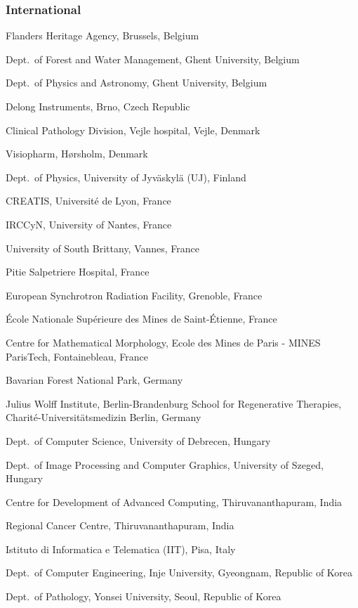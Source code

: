 \subsubsection*{International}
{\small
\begin{trivlist}
\item Flanders Heritage Agency, Brussels, Belgium
\item Dept.~of Forest and Water Management, Ghent University, Belgium
\item Dept.~of Physics and Astronomy, Ghent University, Belgium
\item Delong Instruments, Brno, Czech Republic
\item Clinical Pathology Division, Vejle hospital, Vejle, Denmark
\item Visiopharm, H{\o}rsholm, Denmark
\item Dept.~of Physics, University of Jyv\"{a}skyl\"{a} (UJ), Finland
\item CREATIS, Universit\' e de Lyon, France
\item IRCCyN, University of Nantes, France
\item University of South Brittany, Vannes, France
\item Pitie Salpetriere Hospital, France
\item European Synchrotron Radiation Facility, Grenoble, France
\item \' Ecole Nationale Sup\' erieure des Mines de Saint-\' Etienne, France
\item Centre for Mathematical Morphology, Ecole des Mines de Paris - MINES ParisTech, Fontainebleau, France
\item Bavarian Forest National Park, Germany
\item Julius Wolff Institute, Berlin-Brandenburg School for Regenerative Therapies, Charit\' e-Universit\"{a}tsmedizin Berlin, Germany
\item Dept.~of Computer Science, University of Debrecen, Hungary
\item Dept.~of Image Processing and Computer Graphics, University of Szeged, Hungary
\item Centre for Development of Advanced Computing, Thiruvananthapuram, India
\item Regional Cancer Centre, Thiruvananthapuram, India
\item Istituto di Informatica e Telematica (IIT), Pisa, Italy
\item Dept.~of Computer Engineering, Inje University, Gyeongnam, Republic of Korea
\item Dept.~of Pathology, Yonsei University, Seoul, Republic of Korea

\end{trivlist}}
